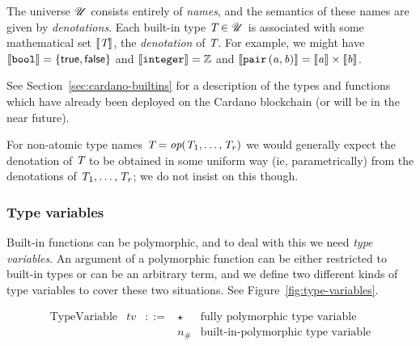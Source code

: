 

The universe $\mathscr{U}$ consists entirely of \textit{names}, and the semantics of
these names are given by \textit{denotations}. Each built-in type $\textit{T} \in \mathscr{U}$
is associated with some mathematical set $\llbracket\mathit{\textit{T}}\rrbracket$, the \textit{denotation}
of $\textit{T}$. For example, we might have $\llbracket\mathit{\texttt{bool}}\rrbracket=
\{\mathsf{true}, \mathsf{false}\}$ and $\llbracket\mathit{\texttt{integer}}\rrbracket = \mathbb{Z}$
and $\llbracket\mathit{\mathtt{pair}\,\mathtt{(}a\mathtt{,}\,b\mathtt{)}}\rrbracket = \llbracket\mathit{a}\rrbracket \times \llbracket\mathit{b}\rrbracket$.

See Section~\ref{sec:cardano-builtins}
for a description of the types and functions which have already been deployed on
the Cardano blockchain (or will be in the near future).

For non-atomic type names $\textit{T} = \textit{op}(\textit{T}_1, \ldots, \textit{T}_r)$ we would generally
expect the denotation of $\textit{T}$ to be obtained in some uniform way (ie,
parametrically) from the denotations of $\textit{T}_1, \ldots, \textit{T}_r$; we do not insist
on this though.

\newcommand{\tv}{\ensuremath{\textit{tv}}}

\subsubsection{Type variables}
\label{sec:type-variables}
Built-in functions can be polymorphic, and to deal with this we need
\textit{type variables}.  An argument of a polymorphic function can be either
restricted to built-in types or can be an arbitrary term, and we define two
different kinds of type variables to cover these two situations.  See
Figure~\ref{fig:type-variables}.

\begin{minipage}{\linewidth}
  \centering
      \[\begin{array}{lrclr}
        \textrm{TypeVariable}    & \tv & ::= & \star & \textrm{fully polymorphic type variable}\\
                                 &           &      & n_{\#} & \textrm{built-in-polymorphic type variable}\\
    \end{array}\]
    \label{fig:type-variables}
\end{minipage}

